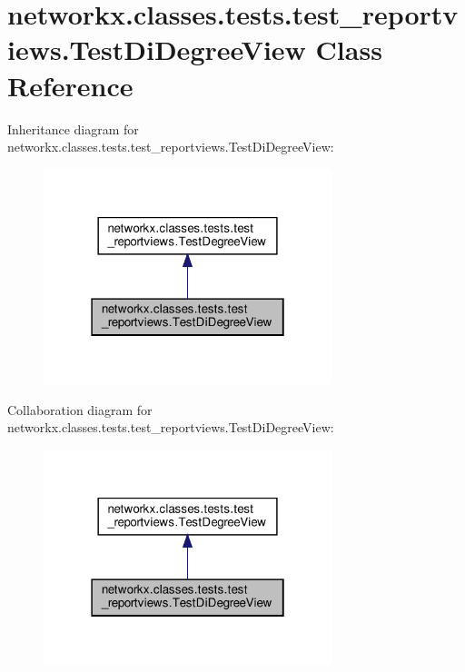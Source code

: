 \hypertarget{classnetworkx_1_1classes_1_1tests_1_1test__reportviews_1_1TestDiDegreeView}{}\section{networkx.\+classes.\+tests.\+test\+\_\+reportviews.\+Test\+Di\+Degree\+View Class Reference}
\label{classnetworkx_1_1classes_1_1tests_1_1test__reportviews_1_1TestDiDegreeView}


Inheritance diagram for networkx.\+classes.\+tests.\+test\+\_\+reportviews.\+Test\+Di\+Degree\+View\+:
\nopagebreak
\begin{figure}[H]
\begin{center}
\leavevmode
\includegraphics[width=238pt]{classnetworkx_1_1classes_1_1tests_1_1test__reportviews_1_1TestDiDegreeView__inherit__graph}
\end{center}
\end{figure}


Collaboration diagram for networkx.\+classes.\+tests.\+test\+\_\+reportviews.\+Test\+Di\+Degree\+View\+:
\nopagebreak
\begin{figure}[H]
\begin{center}
\leavevmode
\includegraphics[width=238pt]{classnetworkx_1_1classes_1_1tests_1_1test__reportviews_1_1TestDiDegreeView__coll__graph}
\end{center}
\end{figure}
